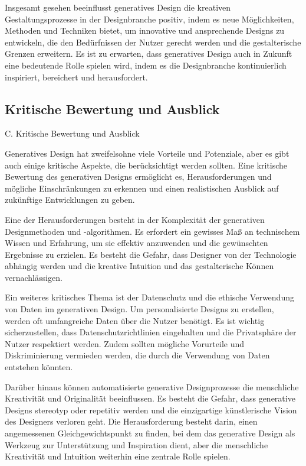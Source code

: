 Insgesamt gesehen beeinflusst generatives Design die kreativen Gestaltungsprozesse in der Designbranche positiv, indem es neue Möglichkeiten, Methoden und Techniken bietet, um innovative und ansprechende Designs zu entwickeln, die den Bedürfnissen der Nutzer gerecht werden und die gestalterische Grenzen erweitern. Es ist zu erwarten, dass generatives Design auch in Zukunft eine bedeutende Rolle spielen wird, indem es die Designbranche kontinuierlich inspiriert, bereichert und herausfordert.

\subsection*{Kritische Bewertung und Ausblick}

C. Kritische Bewertung und Ausblick

Generatives Design hat zweifelsohne viele Vorteile und Potenziale, aber es gibt auch einige kritische Aspekte, die berücksichtigt werden sollten. Eine kritische Bewertung des generativen Designs ermöglicht es, Herausforderungen und mögliche Einschränkungen zu erkennen und einen realistischen Ausblick auf zukünftige Entwicklungen zu geben.

Eine der Herausforderungen besteht in der Komplexität der generativen Designmethoden und -algorithmen. Es erfordert ein gewisses Maß an technischem Wissen und Erfahrung, um sie effektiv anzuwenden und die gewünschten Ergebnisse zu erzielen. Es besteht die Gefahr, dass Designer von der Technologie abhängig werden und die kreative Intuition und das gestalterische Können vernachlässigen.

Ein weiteres kritisches Thema ist der Datenschutz und die ethische Verwendung von Daten im generativen Design. Um personalisierte Designs zu erstellen, werden oft umfangreiche Daten über die Nutzer benötigt. Es ist wichtig sicherzustellen, dass Datenschutzrichtlinien eingehalten und die Privatsphäre der Nutzer respektiert werden. Zudem sollten mögliche Vorurteile und Diskriminierung vermieden werden, die durch die Verwendung von Daten entstehen könnten.

Darüber hinaus können automatisierte generative Designprozesse die menschliche Kreativität und Originalität beeinflussen. Es besteht die Gefahr, dass generative Designs stereotyp oder repetitiv werden und die einzigartige künstlerische Vision des Designers verloren geht. Die Herausforderung besteht darin, einen angemessenen Gleichgewichtspunkt zu finden, bei dem das generative Design als Werkzeug zur Unterstützung und Inspiration dient, aber die menschliche Kreativität und Intuition weiterhin eine zentrale Rolle spielen.

